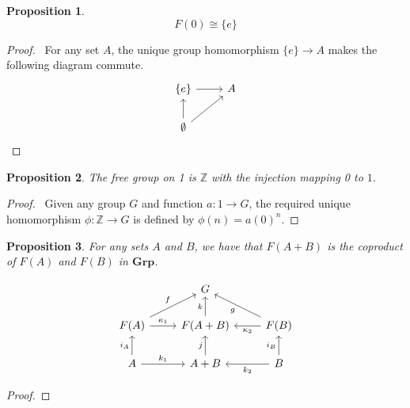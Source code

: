 \documentclass{book}
\let\qed\relax
\newtheorem{prop}{Proposition}[chapter]
\theoremstyle{definition}
\newcommand{\Grp}{\ensuremath{\mathbf{Grp}}}
\begin{document}
\begin{prop}
    \[ F(0) \cong \{e\} \]
\end{prop}

\begin{proof}
    \pf\ For any set $A$, the unique group homomorphism $\{e\} \rightarrow A$ makes the following diagram commute.
    \[ \begin{tikzcd}
        \{e\} \arrow[r] & A \\
        \emptyset \arrow[u] \arrow[ur]
    \end{tikzcd} \]
\end{proof}

\begin{prop}
    The free group on 1 is $\mathbb{Z}$ with the injection mapping 0 to $1$.
\end{prop}

\begin{proof}
    \pf\ Given any group $G$ and function $a : 1 \rightarrow G$, the required unique homomorphism $\phi : \mathbb{Z} \rightarrow G$ is defined by $\phi(n) = a(0)^n$. \qed
\end{proof}

\begin{prop}
    For any sets $A$ and $B$, we have that $F(A+B)$ is the coproduct of $F(A)$ and $F(B)$ in $\Grp$.
\end{prop}

\[ \begin{tikzcd}
    & G & \\
    F(A) \arrow[r,"\kappa_1"] \arrow[ur,"f"] & F(A+B) \arrow[u,"k"] & \arrow[l,"\kappa_2"] F(B) \arrow[ul,"g"] \\
    A \arrow[r,"k_1"] \arrow[u,"i_A"] & A+B \arrow[u,"j"] & \arrow[l,"k_2"] \arrow[u,"i_B"] B
\end{tikzcd} \]

\begin{proof}
    \pf
    \qed
\end{proof}
\end{document}
